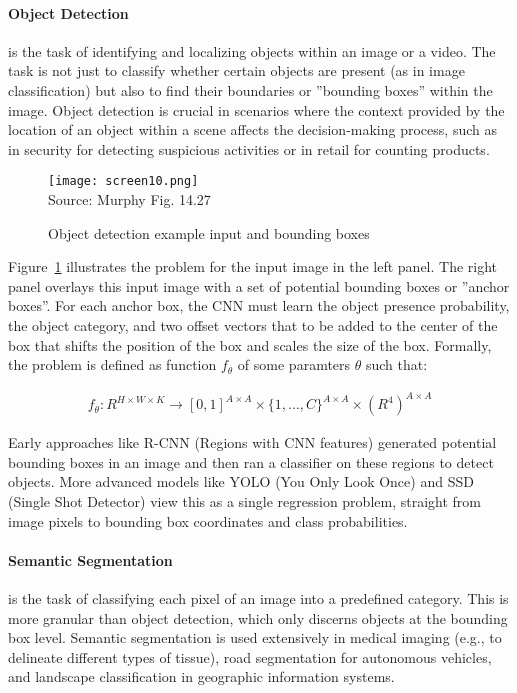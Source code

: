 \paragraph*{Object Detection} is the task of identifying and localizing objects within an image or a video. The task is not just to classify whether certain objects are present (as in image classification) but also to find their boundaries or ''bounding boxes'' within the image. Object detection is crucial in scenarios where the context provided by the location of an object within a scene affects the decision-making process, such as in security for detecting suspicious activities or in retail for counting products.

\begin{figure}
\centering
\texttt{[image: screen10.png]} \\

\scriptsize Source: Murphy Fig. 14.27
\normalsize
\caption{Object detection example input and bounding boxes}
\label{fig:screen10_chap16}
\end{figure}

Figure~\ref{fig:screen10_chap16} illustrates the problem for the input image in the left panel. The right panel overlays this input image with a set of potential bounding boxes or ''anchor boxes''. For each anchor box, the CNN must learn the object presence probability, the object category, and two offset vectors that to be added to the center of the box that shifts the position of the box and scales the size of the box. Formally, the problem is defined as function $f_\theta$ of some paramters $\theta$ such that:

\begin{align*}
f_\theta: R^{H\times W \times K} \rightarrow [0,1]^{A \times A} \times \{1, \ldots, C\}^{A \times A} \times (R^4)^{A \times A}
\end{align*}


Early approaches like R-CNN (Regions with CNN features) generated potential bounding boxes in an image and then ran a classifier on these regions to detect objects. More advanced models like YOLO (You Only Look Once) and SSD (Single Shot Detector) view this as a single regression problem, straight from image pixels to bounding box coordinates and class probabilities.

\paragraph*{Semantic Segmentation} is the task of classifying each pixel of an image into a predefined category. This is more granular than object detection, which only discerns objects at the bounding box level. Semantic segmentation is used extensively in medical imaging (e.g., to delineate different types of tissue), road segmentation for autonomous vehicles, and landscape classification in geographic information systems.

